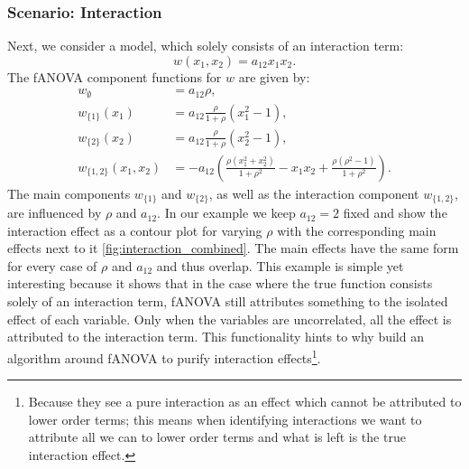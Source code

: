 \subsubsection{Scenario: Interaction}
Next, we consider a model, which solely consists of an interaction term:
$$w(x_1, x_2) = a_{12} x_1 x_2.$$
The fANOVA component functions for $w$ are given by:
\begin{align*}
    w_{\emptyset} &= a_{12} \rho, \\[3pt]
    w_{\{1\}}(x_1) &= a_{12} \frac{\rho}{1+ \rho} (x_1^2 - 1), \\[3pt]
    w_{\{2\}}(x_2) &= a_{12} \frac{\rho}{1+ \rho} (x_2^2 - 1), \\[3pt]
    w_{\{1,2\}}(x_1,x_2) 
&= -a_{12}\!\left(
    \frac{\rho(x_1^2+x_2^2)}{1+\rho^2} 
    - x_1 x_2 
    + \frac{\rho(\rho^2-1)}{1+\rho^2}
   \right).
\end{align*}
The main components $w_{\{1\}}$ and $w_{\{2\}}$, as well as the interaction component $w_{\{1,2\}}$, are influenced by $\rho$ and $a_{12}$.
In our example we keep $a_{12} = 2$ fixed and show the interaction effect as a contour plot for varying $\rho$ with the corresponding main effects next to it \autoref{fig:interaction_combined}.
The main effects have the same form for every case of $\rho$ and $a_{12}$ and thus overlap. This example is simple yet interesting because it shows that in the case where the true function consists solely of an interaction term, fANOVA still attributes something to the isolated effect of each variable. Only when the variables are uncorrelated, all the effect is attributed to the interaction term. This functionality hints to why \cite{lengerich2020} build an algorithm around fANOVA to purify interaction effects\footnote{Because they see a pure interaction as an effect which cannot be attributed to lower order terms; this means when identifying interactions we want to attribute all we can to lower order terms and what is left is the true interaction effect.}.


